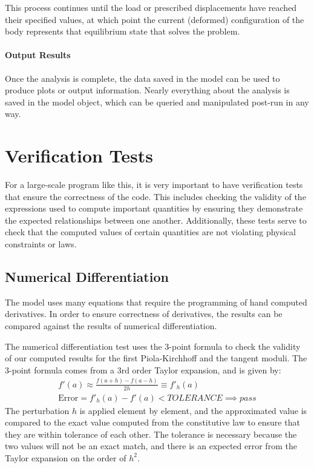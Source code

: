 \documentclass[]{spie}  %
\begin{document}
This process continues until the load or prescribed displacements have reached their specified values, at which point the current (deformed) configuration of the body represents that equilibrium state that solves the problem.

\paragraph{Output Results}
Once the analysis is complete, the data saved in the model can be used to produce plots or output information. Nearly everything about the analysis is saved in the model object, which can be queried and manipulated post-run in any way.

\section{Verification Tests}
For a large-scale program like this, it is very important to have verification tests that ensure the correctness of the code. This includes checking the validity of the expressions used to compute important quantities by ensuring they demonstrate the expected relationships between one another. Additionally, these tests serve to check that the computed values of certain quantities are not violating physical constraints or laws.

\subsection{Numerical Differentiation}
The model uses many equations that require the programming of hand computed derivatives. In order to ensure correctness of derivatives, the results can be compared against the results of numerical differentiation.

The numerical differentiation test uses the 3-point formula to check the validity of our computed results for the first Piola-Kirchhoff and the tangent moduli. The 3-point formula comes from a 3rd order Taylor expansion, and is given by:
\begin{gather}
\label{eq: 3 point formula}
f'(a) \approx \frac{f(a + h) - f(a - h)}{2h} \equiv f'_h(a) \\[1ex]
\textrm{Error} = f'_h(a) - f'(a) < TOLERANCE \implies pass
\end{gather}
The perturbation $h$ is applied element by element, and the approximated value is compared to the exact value computed from the constitutive law to ensure that they are within tolerance of each other. The tolerance is necessary because the two values will not be an exact match, and there is an expected error from the Taylor expansion on the order of $h^2$. 
\end{document}
